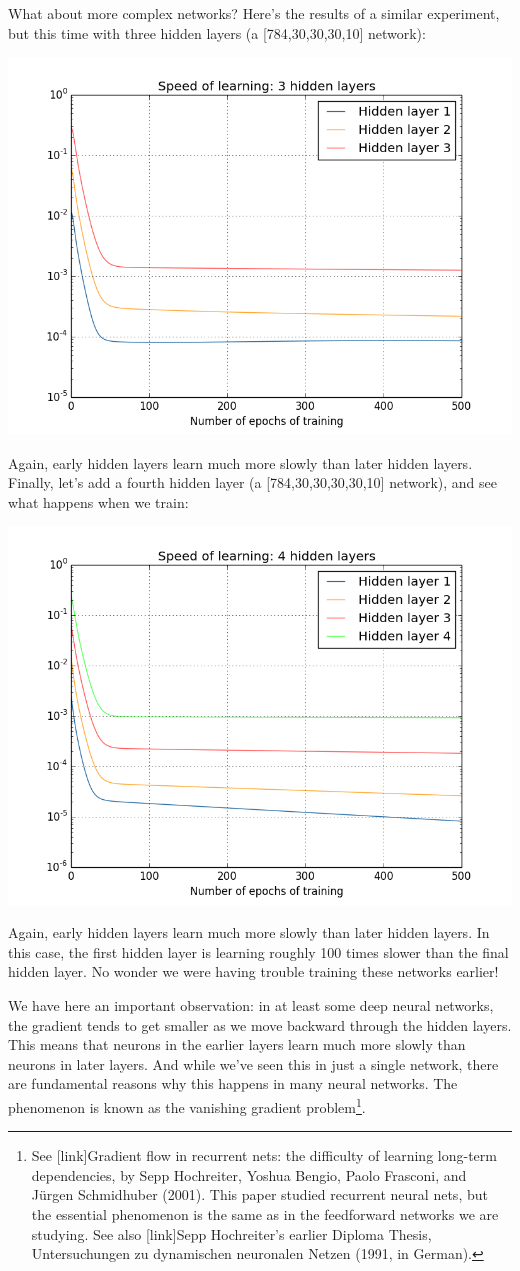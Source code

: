 \documentclass[a4paper,twoside,10pt]{book}
\begin{document}
What about more complex networks? Here's the results of a similar experiment, but this time with three hidden layers (a [784,30,30,30,10] network):
\begin{center}
	\includegraphics[width=0.7\linewidth]{figures/ch5/training_speed_3_layers}
\end{center}
Again, early hidden layers learn much more slowly than later hidden layers. Finally, let's add a fourth hidden layer (a [784,30,30,30,30,10] network), and see what happens when we train:
\begin{center}
	\includegraphics[width=0.7\linewidth]{figures/ch5/training_speed_4_layers}
\end{center}
Again, early hidden layers learn much more slowly than later hidden layers. In this case, the first hidden layer is learning roughly 100 times slower than the final hidden layer. No wonder we were having trouble training these networks earlier!

We have here an important observation: in at least some deep neural networks, the gradient tends to get smaller as we move backward through the hidden layers. This means that neurons in the earlier layers learn much more slowly than neurons in later layers. And while we've seen this in just a single network, there are fundamental reasons why this happens in many neural networks. The phenomenon is known as the vanishing gradient problem\footnote{See [link]Gradient flow in recurrent nets: the difficulty of learning long-term dependencies, by Sepp Hochreiter, Yoshua Bengio, Paolo Frasconi, and J\"urgen Schmidhuber (2001). This paper studied recurrent neural nets, but the essential phenomenon is the same as in the feedforward networks we are studying. See also [link]Sepp Hochreiter's earlier Diploma Thesis, Untersuchungen zu dynamischen neuronalen Netzen (1991, in German).}.
\end{document}
